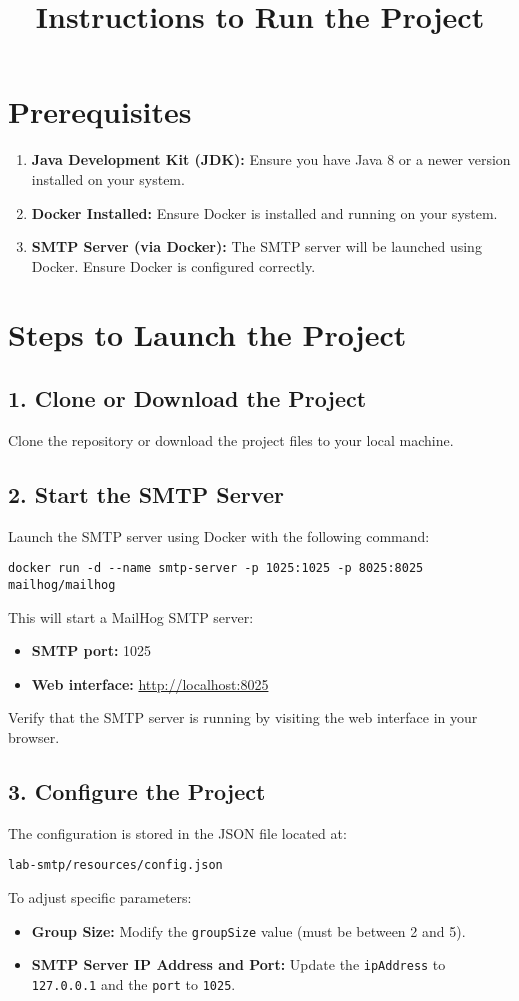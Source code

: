 \documentclass[a4paper,12pt]{article}
\title{Instructions to Run the Project}
\author{}
\date{}
\begin{document}
\maketitle

\section*{Prerequisites}
\begin{enumerate}
    \item \textbf{Java Development Kit (JDK):} Ensure you have Java 8 or a newer version installed on your system.
    \item \textbf{Docker Installed:} Ensure Docker is installed and running on your system.
    \item \textbf{SMTP Server (via Docker):} The SMTP server will be launched using Docker. Ensure Docker is configured correctly.
\end{enumerate}

\section*{Steps to Launch the Project}

\subsection*{1. Clone or Download the Project}
Clone the repository or download the project files to your local machine.

\subsection*{2. Start the SMTP Server}
Launch the SMTP server using Docker with the following command:
\begin{verbatim}
docker run -d --name smtp-server -p 1025:1025 -p 8025:8025 mailhog/mailhog
\end{verbatim}
This will start a MailHog SMTP server:
\begin{itemize}
    \item \textbf{SMTP port:} 1025
    \item \textbf{Web interface:} \url{http://localhost:8025}
\end{itemize}
Verify that the SMTP server is running by visiting the web interface in your browser.

\subsection*{3. Configure the Project}
The configuration is stored in the JSON file located at:
\begin{verbatim}
lab-smtp/resources/config.json
\end{verbatim}
To adjust specific parameters:
\begin{itemize}
    \item \textbf{Group Size:} Modify the \texttt{groupSize} value (must be between 2 and 5).
    \item \textbf{SMTP Server IP Address and Port:} Update the \texttt{ipAddress} to \texttt{127.0.0.1} and the \texttt{port} to \texttt{1025}.
\end{itemize}
\end{document}
